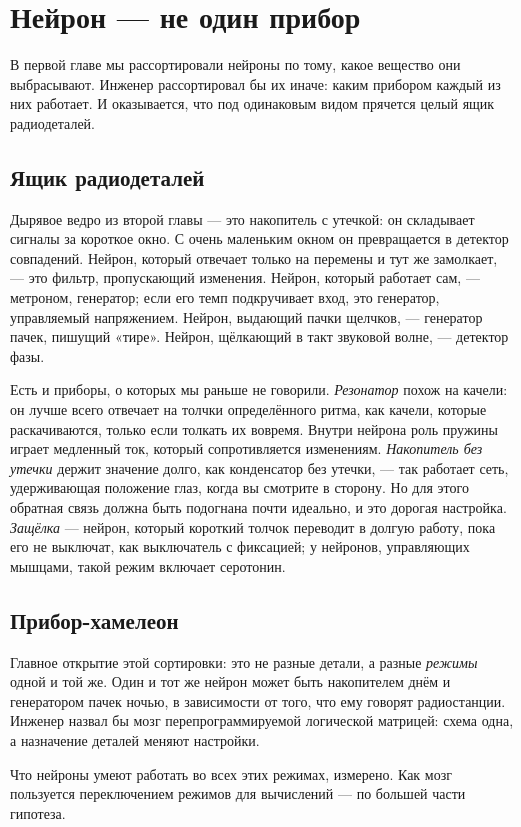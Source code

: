 \chapter{Нейрон --- не один прибор}

В первой главе мы рассортировали нейроны по тому, какое вещество они выбрасывают. Инженер рассортировал бы их иначе: каким прибором каждый из них работает. И оказывается, что под одинаковым видом прячется целый ящик радиодеталей.

\section*{Ящик радиодеталей}

Дырявое ведро из второй главы --- это накопитель с утечкой: он складывает сигналы за короткое окно. С очень маленьким окном он превращается в детектор совпадений. Нейрон, который отвечает только на перемены и тут же замолкает, --- это фильтр, пропускающий изменения. Нейрон, который работает сам, --- метроном, генератор; если его темп подкручивает вход, это генератор, управляемый напряжением. Нейрон, выдающий пачки щелчков, --- генератор пачек, пишущий «тире». Нейрон, щёлкающий в такт звуковой волне, --- детектор фазы.


Есть и приборы, о которых мы раньше не говорили. \emph{Резонатор} похож на качели: он лучше всего отвечает на толчки определённого ритма, как качели, которые раскачиваются, только если толкать их вовремя. Внутри нейрона роль пружины играет медленный ток, который сопротивляется изменениям. \emph{Накопитель без утечки} держит значение долго, как конденсатор без утечки, --- так работает сеть, удерживающая положение глаз, когда вы смотрите в сторону. Но для этого обратная связь должна быть подогнана почти идеально, и это дорогая настройка. \emph{Защёлка} --- нейрон, который короткий толчок переводит в долгую работу, пока его не выключат, как выключатель с фиксацией; у нейронов, управляющих мышцами, такой режим включает серотонин.

\section*{Прибор-хамелеон}

Главное открытие этой сортировки: это не разные детали, а разные \emph{режимы} одной и той же. Один и тот же нейрон может быть накопителем днём и генератором пачек ночью, в зависимости от того, что ему говорят радиостанции. Инженер назвал бы мозг перепрограммируемой логической матрицей: схема одна, а назначение деталей меняют настройки.

Что нейроны умеют работать во всех этих режимах, измерено. Как мозг пользуется переключением режимов для вычислений --- по большей части гипотеза.

